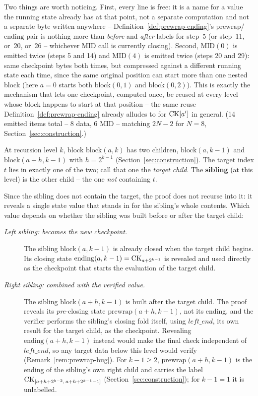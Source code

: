 Two things are worth noticing. First, every 
line is free: it is a name for a value the running state already has at
that point, not a separate computation and not a separate byte written
anywhere -- Definition~\ref{def:prewrap-ending}'s
$\mathrm{prewrap}$/$\mathrm{ending}$ pair is nothing more than \emph{before}
and \emph{after} labels for step~5 (or step~11, or~20, or~26 -- whichever
$\mathrm{MID}$ call is currently closing). Second, $\mathrm{MID}(0)$ is
emitted twice (steps 5 and
14) and $\mathrm{MID}(4)$ is emitted twice (steps 20 and 29): same
checkpoint bytes both times, but compressed against a different running
state each time, since the same original position can start more than one
nested block (here $a=0$ starts both $\mathrm{block}(0,1)$ and
$\mathrm{block}(0,2)$). This is exactly the mechanism that lets one
checkpoint, computed once, be reused at every level whose block happens to
start at that position -- the same reuse Definition~\ref{def:prewrap-ending}
already alludes to for $\mathrm{CK}[a']$ in general. (14 emitted items total -- 8
data, 6 $\mathrm{MID}$ -- matching $2N-2$ for $N=8$, Section~\ref{sec:construction}.)

\begin{definition}[Sibling]
\label{def:sibling}
At recursion level $k$, block $\mathrm{block}(a,k)$ has two children,
$\mathrm{block}(a, k-1)$ and $\mathrm{block}(a+h, k-1)$ with $h = 2^{k-1}$
(Section~\ref{sec:construction}). The target index $t$ lies in exactly one
of the two; call that one the \emph{target child}. The \textbf{sibling} (at
this level) is the other child -- the one \emph{not} containing $t$.
\end{definition}

Since the sibling does not contain the target, the proof does not recurse
into it: it reveals a single state value that stands in for the sibling's
whole contents. Which value depends on whether the sibling was built
before or after the target child:

\begin{description}
\item[\emph{Left sibling: becomes the new checkpoint.}] The sibling
  $\mathrm{block}(a,k-1)$ is already closed when the target child begins.
  Its closing state $\mathrm{ending}(a,k-1) = \mathrm{CK}_{a+2^{k-1}}$ is revealed
  and used directly as the checkpoint that starts the evaluation of the
  target child.
\item[\emph{Right sibling: combined with the verified value.}] The sibling
  $\mathrm{block}(a+h,k-1)$ is built after the target child. The proof
  reveals its \emph{pre}-closing state $\mathrm{prewrap}(a+h,k-1)$, not its
  ending, and the verifier performs the sibling's closing fold itself,
  using $\mathit{left\_end}$, its own result for the target child, as the
  checkpoint. Revealing $\mathrm{ending}(a+h,k-1)$ instead would make the
  final check independent of $\mathit{left\_end}$, so any target data below
  this level would verify (Remark~\ref{rem:prewrap-bug}). For $k-1 \ge 2$,
  $\mathrm{prewrap}(a+h,k-1)$ is the ending of the sibling's own right child
  and carries the label $\mathrm{CK}_{[a+h+2^{k-2},\,a+h+2^{k-1}-1]}$
  (Section~\ref{sec:construction}); for $k-1=1$ it is unlabelled.
\end{description}

